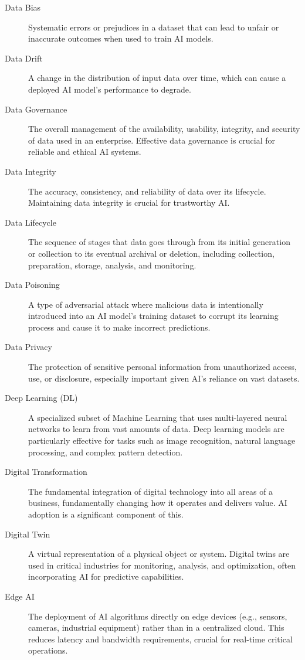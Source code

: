 \begin{description}
    \item[Data Bias] Systematic errors or prejudices in a dataset that can lead to unfair or inaccurate outcomes when used to train AI models.
    \item[Data Drift] A change in the distribution of input data over time, which can cause a deployed AI model's performance to degrade.
    \item[Data Governance] The overall management of the availability, usability, integrity, and security of data used in an enterprise. Effective data governance is crucial for reliable and ethical AI systems.
    \item[Data Integrity] The accuracy, consistency, and reliability of data over its lifecycle. Maintaining data integrity is crucial for trustworthy AI.
    \item[Data Lifecycle] The sequence of stages that data goes through from its initial generation or collection to its eventual archival or deletion, including collection, preparation, storage, analysis, and monitoring.
    \item[Data Poisoning] A type of adversarial attack where malicious data is intentionally introduced into an AI model's training dataset to corrupt its learning process and cause it to make incorrect predictions.
    \item[Data Privacy] The protection of sensitive personal information from unauthorized access, use, or disclosure, especially important given AI's reliance on vast datasets.
    \item[Deep Learning (DL)] A specialized subset of Machine Learning that uses multi-layered neural networks to learn from vast amounts of data. Deep learning models are particularly effective for tasks such as image recognition, natural language processing, and complex pattern detection.
    \item[Digital Transformation] The fundamental integration of digital technology into all areas of a business, fundamentally changing how it operates and delivers value. AI adoption is a significant component of this.
    \item[Digital Twin] A virtual representation of a physical object or system. Digital twins are used in critical industries for monitoring, analysis, and optimization, often incorporating AI for predictive capabilities.
    \item[Edge AI] The deployment of AI algorithms directly on edge devices (e.g., sensors, cameras, industrial equipment) rather than in a centralized cloud. This reduces latency and bandwidth requirements, crucial for real-time critical operations.

\end{description}
